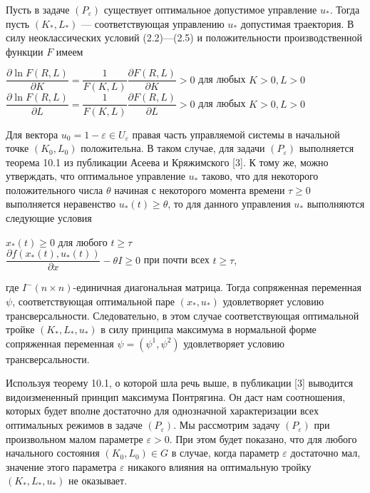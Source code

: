 Пусть в задаче $ (P_\varepsilon) $ существует оптимальное допустимое управление $ u_* $. Тогда пусть $ (K_*,L_*) $ --- соответствующая управлению $ u_* $ допустимая траектория.
В силу неоклассических условий (2.2)---(2.5) и положительности производственной функции $ F $ имеем 
\begin{center}
	$ \dfrac{\partial \ln F(R, L)}{\partial K} = \dfrac{1}{F(K, L)}\dfrac{\partial F(R, L)}{\partial K} > 0$  для любых  $K>0, L > 0 $\\
	$ \dfrac{\partial \ln F(R, L)}{\partial L} = \dfrac{1}{F(K, L)}\dfrac{\partial F(R, L)}{\partial L} > 0$  для любых  $K>0, L > 0 $
\end{center}
Для вектора $ u_0 =1-\varepsilon \in U_\varepsilon $ правая часть управляемой системы в начальной точке $ (K_0,L_0) $ положительна. В таком случае, для задачи $ (P_\varepsilon) $ выполняется теорема 10.1 из публикации Асеева и Кряжимского [3]. К тому же, можно утверждать, что оптимальное управление $ u_* $ таково, что для некоторого положительного числа $ \theta $ начиная с некоторого момента времени $ \tau \ge 0 $ выполняется неравенство $ u_* (t) \ge \theta$, то для данного управления $ u_* $ выполняются следующие условия 
\begin{center}
	$ x_*(t) \ge 0 $ для любого $ t \ge \tau $\\
	$ \dfrac{\partial f(x_*(t),u_*(t))}{\partial x} - \theta  I \ge 0 $ при почти всех $ t \ge \tau ,$
\end{center}
где $ I^- (n\times n) $-единичная диагональная матрица. Тогда сопряженная переменная $ \psi  $, соответствующая оптимальной паре $ (x_*,u_*) $ удовлетворяет условию трансверсальности. Следовательно, в этом случае соответствующая оптимальной тройке $ (K_*,L_*,u_*) $ в силу принципа максимума в нормальной форме  сопряженная переменная $ \psi =( \psi^1,\psi^2) $ удовлетворяет условию трансверсальности. 

Используя теорему 10.1, о которой шла речь выше, в публикации [3] выводится видоизмененный принцип максимума Понтрягина. Он даст нам соотношения, которых будет вполне достаточно для однозначной характеризации всех оптимальных режимов в задаче $ (P_\varepsilon) $. Мы рассмотрим задачу $ (P_\varepsilon) $ при произвольном малом параметре $ \varepsilon>0 $. При этом будет показано, что для любого начального состояния $ (K_0,L_0) \in G $ в случае, когда параметр $ \varepsilon $ достаточно мал, значение этого параметра $ \varepsilon $ никакого влияния на оптимальную тройку $ (K_*,L_*,u_*) $ не оказывает.

